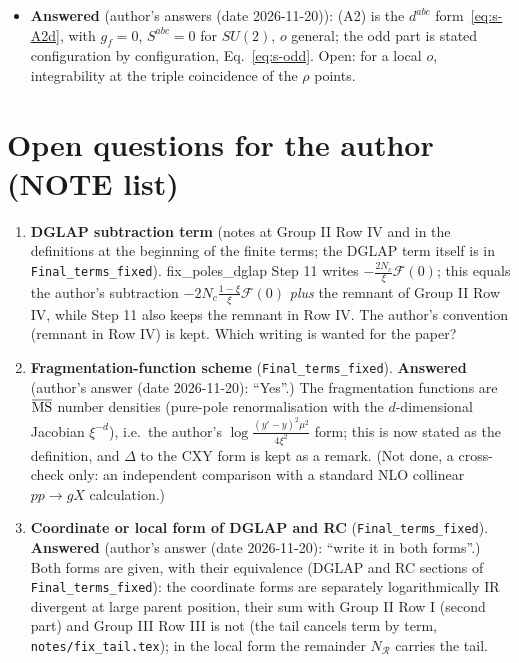 \documentclass[9pt]{article}
\numberwithin{equation}{section}
\begin{document}
{\begin{itemize}
\item[(5)] \textbf{Answered} (author's answers (date 2026-11-20)): (A2) is the $d^{abc}$ form~\eqref{eq:s-A2d}, with $g_{f}=0$, $S^{abc}=0$ for $SU(2)$, $o$ general; the odd part is stated configuration by configuration, Eq.~\eqref{eq:s-odd}. Open: for a local $o$, integrability at the triple coincidence of the $\rho$ points.
\end{itemize}

}\par

{\color{red}
\section{Open questions for the author (NOTE list)}
\begin{enumerate}
\item \textbf{DGLAP subtraction term} (notes at Group II Row IV and in the definitions at the beginning of the finite terms; the DGLAP term itself is in \texttt{Final\_terms\_fixed}). fix\_poles\_dglap Step 11 writes $-\frac{2N_{c}}{\xi}\mathcal{F}(0)$; this equals the author's subtraction $-2N_{c}\frac{1-\xi}{\xi}\mathcal{F}(0)$ \emph{plus} the remnant of Group II Row IV, while Step 11 also keeps the remnant in Row IV. The author's convention (remnant in Row IV) is kept. Which writing is wanted for the paper?
\item \textbf{Fragmentation-function scheme} (\texttt{Final\_terms\_fixed}). \textbf{Answered} (author's answer (date 2026-11-20): ``Yes''.) The fragmentation functions are $\overline{\rm MS}$ number densities (pure-pole renormalisation with the $d$-dimensional Jacobian $\xi^{-d}$), i.e.\ the author's $\log\frac{(y'-y)^{2}\mu^{2}}{4\xi^{2}}$ form; this is now stated as the definition, and $\Delta$ to the CXY form is kept as a remark. (Not done, a cross-check only: an independent comparison with a standard NLO collinear $pp\to gX$ calculation.)
\item \textbf{Coordinate or local form of DGLAP and RC} (\texttt{Final\_terms\_fixed}). \textbf{Answered} (author's answer (date 2026-11-20): ``write it in both forms''.) Both forms are given, with their equivalence (DGLAP and RC sections of \texttt{Final\_terms\_fixed}): the coordinate forms are separately logarithmically IR divergent at large parent position, their sum with Group II Row I (second part) and Group III Row III is not (the tail cancels term by term, \texttt{notes/fix\_tail.tex}); in the local form the remainder $N_{\mathcal{R}}$ carries the tail.

\end{enumerate}}
\end{document}
